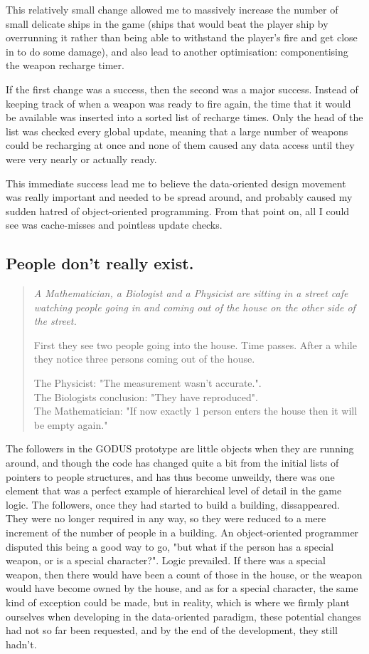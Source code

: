 This relatively small change allowed me to massively increase the number of
small delicate ships in the game (ships that would beat the player ship by
overrunning it rather than being able to withstand the player's fire and get
close in to do some damage), and also lead to another optimisation:
componentising the weapon recharge timer.

If the first change was a success, then the second was a major success.
Instead of keeping track of when a weapon was ready to fire again, the time
that it would be available was inserted into a sorted list of recharge times.
Only the head of the list was checked every global update, meaning that a large
number of weapons could be recharging at once and none of them caused any data
access until they were very nearly or actually ready.

This immediate success lead me to believe the data-oriented design movement was
really important and needed to be spread around, and probably caused my sudden
hatred of object-oriented programming. From that point on, all I could see was
cache-misses and pointless update checks.

\subsection{People don't really exist.}

\begin{quote}
\em \small
A Mathematician, a Biologist and a Physicist are sitting in a street cafe 
watching people going in and coming out of the house on the other side of 
the street.

First they see two people going into the house. Time passes.  After a while 
they notice three persons coming out of the house.

The Physicist: "The measurement wasn't accurate.". \\
The Biologists conclusion: "They have reproduced". \\
The Mathematician: "If now exactly 1 person enters the house then it will 
be empty again."
\end{quote}

The followers in the GODUS prototype are little objects when they are running
around, and though the code has changed quite a bit from the initial lists of
pointers to people structures, and has thus become unweildy, there was one
element that was a perfect example of hierarchical level of detail in the
game logic. The followers, once they had started to build a building, dissappeared.
They were no longer required in any way, so they were reduced to a mere
increment of the number of people in a building. An object-oriented
programmer disputed this being a good way to go, "but what if the person has a
special weapon, or is a special character?". Logic prevailed. If there was
a special weapon, then there would have been a count of those in the house, or
the weapon would have become owned by the house, and as for a special
character, the same kind of exception could be made, but in reality, which is
where we firmly plant ourselves when developing in the data-oriented paradigm,
these potential changes had not so far been requested, and by the end of the
development, they still hadn't.

